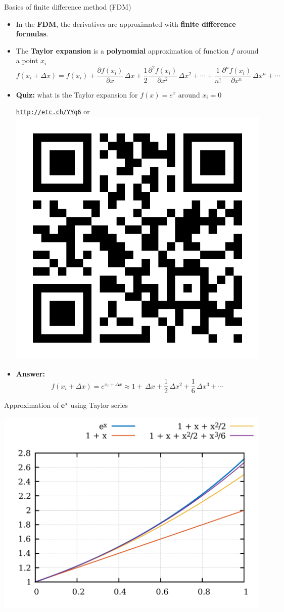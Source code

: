 \begin{frame}{Basics of finite difference method (FDM)}
\begin{itemize}
\item In the \alert{\bf FDM}, the derivatives are approximated
with {\bf finite difference formulas}.
\pause
\item The \alert{\bf Taylor expansion} is a \textbf{polynomial} approximation of function $f$ around
a point $x_{i}$
\[
f(x_{i}+\Delta x)=f(x_{i})+\frac{\partial f(x_{i})}{\partial x}\,\Delta x+\frac{1}{2}\frac{\partial^{2}f(x_{i})}{\partial x^{2}}\,\Delta x^{2}+\cdots+\frac{1}{n!}\frac{\partial^{n}f(x_{i})}{\partial x^{n}}\,\Delta x^{n}+\cdots
\]
\pause
\item \alert{\textbf{Quiz:}} what is the Taylor expansion for $f(x)=e^{x}$ around
$x_{i}=0$

\begin{center}
		\href{http://etc.ch/YYq6}{\textcolor{indigo(dye)}{\tt http://etc.ch/YYq6}} \quad or \quad 
		\includegraphics[height=0.1\columnwidth]{figures/reactive-transport/polls.png}
	\end{center}
%
\hiddenpause
\item \textbf{Answer:}
\[
f(x_{i}+\Delta x)=e^{x_{i}+\Delta x} \approx 1+\, \Delta x+\frac{1}{2}\, \Delta x^{2}+\frac{1}{6}\, \Delta x^{3}+\cdots
\]
\end{itemize}
\end{frame}
%
%
\begin{frame}{Approximation of $\boldsymbol{e^{\boldsymbol{x}}}$ using Taylor series}
\begin{center}
\includegraphics[height=0.9\textheight]{figures/reactive-transport/taylor-expansion-exp}
\par\end{center}

\end{frame}
